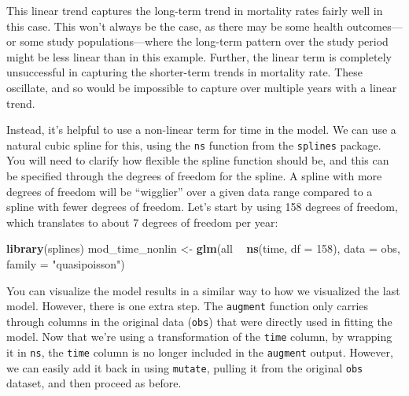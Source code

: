 \documentclass[
]{book}
\newenvironment{Shaded}{\begin{snugshade}}{\end{snugshade}}
\newcommand{\DataTypeTok}[1]{\textcolor[rgb]{0.13,0.29,0.53}{#1}}
\newcommand{\DecValTok}[1]{\textcolor[rgb]{0.00,0.00,0.81}{#1}}
\newcommand{\KeywordTok}[1]{\textcolor[rgb]{0.13,0.29,0.53}{\textbf{#1}}}
\newcommand{\NormalTok}[1]{#1}
\newcommand{\OperatorTok}[1]{\textcolor[rgb]{0.81,0.36,0.00}{\textbf{#1}}}
\newcommand{\StringTok}[1]{\textcolor[rgb]{0.31,0.60,0.02}{#1}}
\begin{document}
This linear trend captures the long-term trend in mortality rates fairly well in
this case. This won't always be the case, as there may be some health
outcomes---or some study populations---where the long-term pattern over the
study period might be less linear than in this example. Further, the linear
term is completely unsuccessful in capturing the shorter-term trends in mortality
rate. These oscillate, and so would be impossible to capture over multiple
years with a linear trend.

Instead, it's helpful to use a non-linear term for time in the model. We can
use a natural cubic spline for this, using the \texttt{ns} function from the \texttt{splines}
package. You will need to clarify how flexible the spline function should be,
and this can be specified through the degrees of freedom for the spline. A
spline with more degrees of freedom will be ``wigglier'' over a given data range
compared to a spline with fewer degrees of freedom. Let's start by using
158 degrees of freedom, which translates to about 7 degrees of freedom per year:

\begin{Shaded}
\begin{Highlighting}[]
\KeywordTok{library}\NormalTok{(splines)}
\NormalTok{mod_time_nonlin <-}\StringTok{ }\KeywordTok{glm}\NormalTok{(all }\OperatorTok{~}\StringTok{ }\KeywordTok{ns}\NormalTok{(time, }\DataTypeTok{df =} \DecValTok{158}\NormalTok{), }
                       \DataTypeTok{data =}\NormalTok{ obs, }\DataTypeTok{family =} \StringTok{"quasipoisson"}\NormalTok{)}
\end{Highlighting}
\end{Shaded}

You can visualize the model results in a similar way to how we visualized the
last model. However, there is one extra step. The \texttt{augment} function only
carries through columns in the original data (\texttt{obs}) that were directly used
in fitting the model. Now that we're using a transformation of the \texttt{time}
column, by wrapping it in \texttt{ns}, the \texttt{time} column is no longer included in the
\texttt{augment} output. However, we can easily add it back in using \texttt{mutate},
pulling it from the original \texttt{obs} dataset, and then proceed as before.
\end{document}
